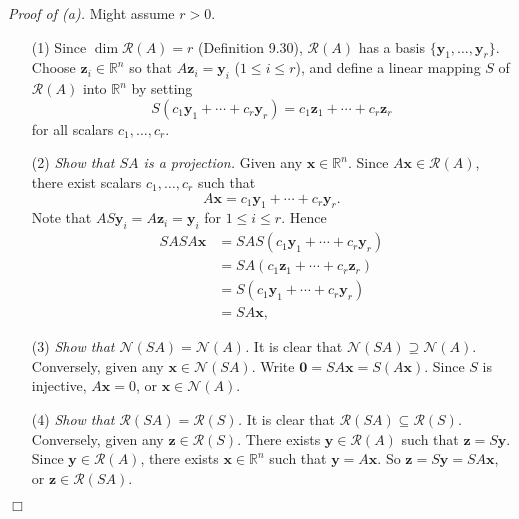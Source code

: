 \documentclass{article}
\begin{document}
\emph{Proof of (a).}
Might assume $r > 0$.
\begin{enumerate}
\item[(1)]
  Since $\dim \mathscr{R}(A) = r$ (Definition 9.30),
  $\mathscr{R}(A)$ has a basis $\{ \mathbf{y}_1,\ldots,\mathbf{y}_r \}$.
  Choose $\mathbf{z}_i \in \mathbb{R}^n$ so that
  $A\mathbf{z}_i = \mathbf{y}_i$ ($1 \leq i \leq r$),
  and define a linear mapping $S$ of $\mathscr{R}(A)$ into $\mathbb{R}^n$ by setting
  \[
    S(c_1 \mathbf{y}_1 + \cdots + c_r \mathbf{y}_r)
    = c_1 \mathbf{z}_1 + \cdots + c_r \mathbf{z}_r
  \]
  for all scalars $c_1, \ldots, c_r$.

\item[(2)]
  \emph{Show that $SA$ is a projection.}
  Given any $\mathbf{x} \in \mathbb{R}^n$.
  Since $A\mathbf{x} \in \mathscr{R}(A)$, there exist scalars $c_1, \ldots, c_r$
  such that
  \[
    A\mathbf{x} = c_1 \mathbf{y}_1 + \cdots + c_r \mathbf{y}_r.
  \]
  Note that $AS \mathbf{y}_i = A \mathbf{z}_i = \mathbf{y}_i$ for $1 \leq i \leq r$.
  Hence
  \begin{align*}
    SASA\mathbf{x}
    &= SAS(c_1 \mathbf{y}_1 + \cdots + c_r \mathbf{y}_r) \\
    &= SA(c_1 \mathbf{z}_1 + \cdots + c_r \mathbf{z}_r) \\
    &= S(c_1 \mathbf{y}_1 + \cdots + c_r \mathbf{y}_r) \\
    &= SA\mathbf{x},
  \end{align*}

\item[(3)]
  \emph{Show that $\mathscr{N}(SA) = \mathscr{N}(A)$.}
  It is clear that $\mathscr{N}(SA) \supseteq \mathscr{N}(A)$.
  Conversely, given any $\mathbf{x} \in \mathscr{N}(SA)$.
  Write $\mathbf{0} = SA\mathbf{x} = S(A\mathbf{x})$.
  Since $S$ is injective, $A\mathbf{x} = 0$, or $\mathbf{x} \in \mathscr{N}(A)$.

\item[(4)]
  \emph{Show that $\mathscr{R}(SA) = \mathscr{R}(S)$.}
  It is clear that $\mathscr{R}(SA) \subseteq \mathscr{R}(S)$.
  Conversely, given any $\mathbf{z} \in \mathscr{R}(S)$.
  There exists $\mathbf{y} \in \mathscr{R}(A)$ such that $\mathbf{z} = S\mathbf{y}$.
  Since $\mathbf{y} \in \mathscr{R}(A)$,
  there exists $\mathbf{x} \in \mathbb{R}^n$ such that $\mathbf{y} = A\mathbf{x}$.
  So $\mathbf{z} = S\mathbf{y} = SA\mathbf{x}$, or $\mathbf{z} \in \mathscr{R}(SA)$.
\end{enumerate}
$\Box$ \\
\end{document}
